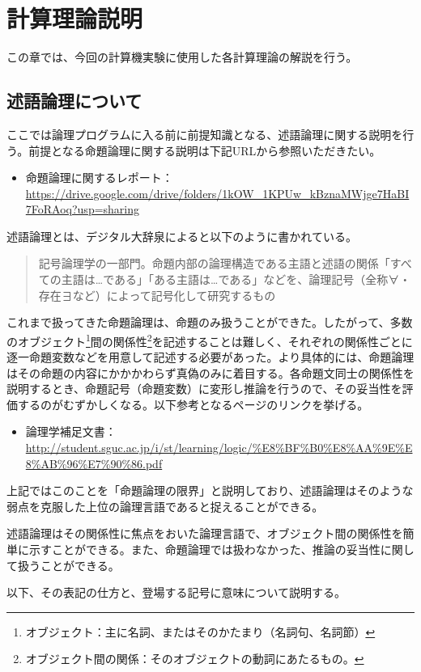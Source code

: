 \documentclass[dvipdfmx]{jsarticle}
\begin{document}
\section{計算理論説明}
この章では、今回の計算機実験に使用した各計算理論の解説を行う。
\subsection{述語論理について}
ここでは論理プログラムに入る前に前提知識となる、述語論理に関する説明を行う。前提となる命題論理に関する説明は下記URLから参照いただきたい。\par
\begin{itemize}
  \item 命題論理に関するレポート：\url{https://drive.google.com/drive/folders/1kOW_1KPUw_kBznaMWjge7HaBI7FoRAoq?usp=sharing}
\end{itemize}
述語論理とは、デジタル大辞泉によると以下のように書かれている。
\begin{quote}
  記号論理学の一部門。命題内部の論理構造である主語と述語の関係「すべての主語は…である」「ある主語は…である」などを、論理記号（全称∀・存在∃など）によって記号化して研究するもの
\end{quote}
これまで扱ってきた命題論理は、命題のみ扱うことができた。したがって、多数のオブジェクト\footnote{オブジェクト：主に名詞、またはそのかたまり（名詞句、名詞節）}間の関係性\footnote{オブジェクト間の関係：そのオブジェクトの動詞にあたるもの。}を記述することは難しく、それぞれの関係性ごとに逐一命題変数などを用意して記述する必要があった。より具体的には、命題論理はその命題の内容にかかかわらず真偽のみに着目する。各命題文同士の関係性を説明するとき、命題記号（命題変数）に変形し推論を行うので、その妥当性を評価するのがむずかしくなる。以下参考となるページのリンクを挙げる。
\begin{itemize}
  \item 論理学補足文書：\url{http://student.sguc.ac.jp/i/st/learning/logic/%E8%BF%B0%E8%AA%9E%E8%AB%96%E7%90%86.pdf}
\end{itemize}
上記ではこのことを「命題論理の限界」と説明しており、述語論理はそのような弱点を克服した上位の論理言語であると捉えることができる。\par
述語論理はその関係性に焦点をおいた論理言語で、オブジェクト間の関係性を簡単に示すことができる。また、命題論理では扱わなかった、推論の妥当性に関して扱うことができる。\par
以下、その表記の仕方と、登場する記号に意味について説明する。
\end{document}
